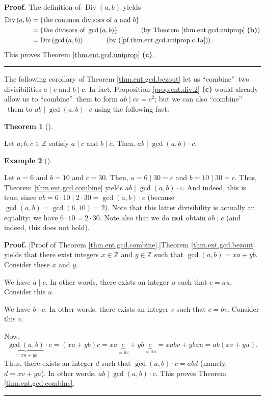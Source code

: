 \documentclass[numbers=enddot,12pt,final,onecolumn,notitlepage]{scrartcl}%
\numberwithin{exer}{subsection}
\theoremstyle{definition}
\newtheorem{theo}{Theorem}[subsection]
\newenvironment{theorem}[1][]
{\begin{theo}[#1]\begin{leftbar}}
{\end{leftbar}\end{theo}}
\newtheorem{exam}[theo]{Example}
\newenvironment{example}[1][]
{\begin{exam}[#1]\begin{leftbar}}
{\end{leftbar}\end{exam}}
\newenvironment{proof}[1][Proof]{\noindent\textbf{#1.} }{\ \rule{0.5em}{0.5em}}
\begin{document}
\begin{proof}
The definition of $\operatorname*{Div}\left(  a,b\right)  $ yields%
\begin{align*}
\operatorname*{Div}\left(  a,b\right)   &  =\left\{  \text{the common divisors
of }a\text{ and }b\right\} \\
&  =\left\{  \text{the divisors of }\gcd\left(  a,b\right)  \right\}
\ \ \ \ \ \ \ \ \ \ \left(  \text{by Theorem \ref{thm.ent.gcd.uniprop}
\textbf{(b)}}\right) \\
&  =\operatorname*{Div}\left(  \gcd\left(  a,b\right)  \right)
\ \ \ \ \ \ \ \ \ \ \left(  \text{by (\ref{pf.thm.ent.gcd.uniprop.c.1a}%
)}\right)  .
\end{align*}
This proves Theorem \ref{thm.ent.gcd.uniprop} \textbf{(c)}.
\end{proof}

The following corollary of Theorem \ref{thm.ent.gcd.bezout} let us
\textquotedblleft combine\textquotedblright\ two divisibilities $a\mid c$ and
$b\mid c$. In fact, Proposition \ref{prop.ent.div.2} \textbf{(c)} would
already allow us to \textquotedblleft combine\textquotedblright\ them to form
$ab\mid cc=c^{2}$; but we can also \textquotedblleft combine\textquotedblright%
\ them to $ab\mid\gcd\left(  a,b\right)  \cdot c$ using the following fact:

\begin{theorem}
\label{thm.ent.gcd.combine}Let $a,b,c\in\mathbb{Z}$ satisfy $a\mid c$ and
$b\mid c$. Then, $ab\mid\gcd\left(  a,b\right)  \cdot c$.
\end{theorem}

\begin{example}
Let $a=6$ and $b=10$ and $c=30$. Then, $a=6\mid30=c$ and $b=10\mid30=c$. Thus,
Theorem \ref{thm.ent.gcd.combine} yields $ab\mid\gcd\left(  a,b\right)  \cdot
c$. And indeed, this is true, since $ab=6\cdot10\mid2\cdot30=\gcd\left(
a,b\right)  \cdot c$ (because $\gcd\left(  a,b\right)  =\gcd\left(
6,10\right)  =2$). Note that this latter divisibility is actually an equality:
we have $6\cdot10=2\cdot30$. Note also that we do \textbf{not} obtain $ab\mid
c$ (and indeed, this does not hold).
\end{example}

\begin{proof}
[Proof of Theorem \ref{thm.ent.gcd.combine}.]Theorem \ref{thm.ent.gcd.bezout}
yields that there exist integers $x\in\mathbb{Z}$ and $y\in\mathbb{Z}$ such
that $\gcd\left(  a,b\right)  =xa+yb$. Consider these $x$ and $y$.

We have $a\mid c$. In other words, there exists an integer $u$ such that
$c=au$. Consider this $u$.

We have $b\mid c$. In other words, there exists an integer $v$ such that
$c=bv$. Consider this $v$.

Now,%
\[
\underbrace{\gcd\left(  a,b\right)  }_{=xa+yb}\cdot c=\left(  xa+yb\right)
c=xa\underbrace{c}_{=bv}+yb\underbrace{c}_{=au}=xabv+ybau=ab\left(
xv+yu\right)  .
\]
Thus, there exists an integer $d$ such that $\gcd\left(  a,b\right)  \cdot
c=abd$ (namely, $d=xv+yu$). In other words, $ab\mid\gcd\left(  a,b\right)
\cdot c$. This proves Theorem \ref{thm.ent.gcd.combine}.
\end{proof}
\end{document}
